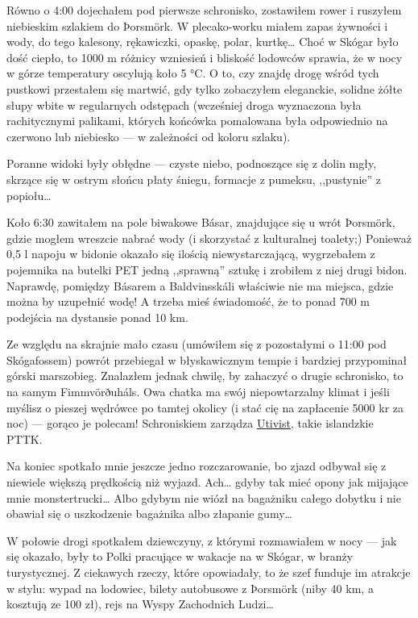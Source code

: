 Równo o 4:00 dojechałem pod pierwsze schronisko, zostawiłem rower i ruszyłem niebieskim szlakiem do Þorsmörk. W plecako-worku miałem zapas żywności i wody, do tego kalesony, rękawiczki, opaskę, polar, kurtkę… Choć w Skógar było dość ciepło, to 1000 m różnicy wzniesień i bliskość lodowców sprawia, że w nocy w górze temperatury oscylują koło 5 °C. O to, czy znajdę drogę wśród tych pustkowi przestałem się martwić, gdy tylko zobaczyłem eleganckie, solidne żółte słupy wbite w regularnych odstępach (wcześniej droga wyznaczona była rachitycznymi palikami, których końcówka pomalowana była odpowiednio na czerwono lub niebiesko --- w zależności od koloru szlaku).

Poranne widoki były obłędne --- czyste niebo, podnoszące się z dolin mgły, skrzące się w ostrym słońcu płaty śniegu, formacje z pumeksu, ,,pustynie'' z popiołu…


Koło 6:30 zawitałem na pole biwakowe Básar,  znajdujące się u wrót Þorsmörk, gdzie mogłem wreszcie nabrać wody (i skorzystać z kulturalnej toalety;) Ponieważ 0,5 l napoju w bidonie okazało się ilością niewystarczającą, wygrzebałem z pojemnika na butelki PET jedną ,,sprawną'' sztukę i zrobiłem z niej drugi bidon. Naprawdę, pomiędzy Básarem a Baldvinsskáli właściwie nie ma miejsca, gdzie można by uzupełnić wodę! A trzeba mieś świadomość, że to ponad 700 m podejścia na dystansie ponad 10 km.

Ze względu na skrajnie mało czasu (umówiłem się z pozostałymi o 11:00 pod Skógafossem) powrót przebiegał w błyskawicznym tempie i bardziej przypominał górski marszobieg. Znalazłem jednak chwilę, by zahaczyć o drugie schronisko, to na samym Fimmvörðuháls. Owa chatka ma swój niepowtarzalny klimat i jeśli myślisz o pieszej wędrówce po tamtej okolicy (i stać cię na zapłacenie 5000 kr za noc) --- gorąco je polecam! Schroniskiem zarządza \href{http://www.utivist.is/english}{Utivist}, takie islandzkie PTTK.

Na koniec spotkało mnie jeszcze jedno rozczarowanie, bo zjazd odbywał się z niewiele większą prędkością niż wyjazd. Ach… gdyby tak mieć opony jak mijające mnie monstertrucki… Albo gdybym nie wiózł na bagażniku całego dobytku i nie obawiał się o uszkodzenie bagażnika albo złapanie gumy…

W połowie drogi spotkałem dziewczyny, z którymi rozmawiałem w nocy --- jak się okazało, były to Polki pracujące w wakacje na w Skógar, w branży turystycznej. Z ciekawych rzeczy, które opowiadały, to że szef funduje im atrakcje w stylu: wypad na lodowiec, bilety autobusowe z Þorsmörk (niby 40 km, a kosztują ze 100 zł), rejs na Wyspy Zachodnich Ludzi…

